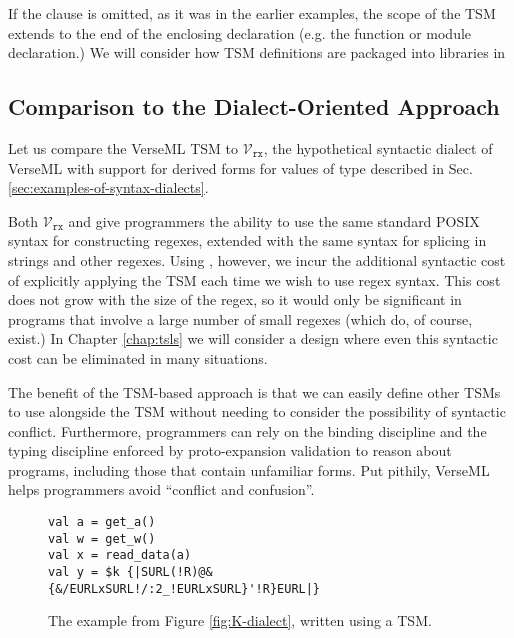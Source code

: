 If the  clause is omitted, as it was in the earlier examples, the scope of the TSM extends to the end of the enclosing declaration (e.g. the function or module declaration.)
We will consider how TSM definitions are packaged into libraries in 

\subsection{Comparison to the Dialect-Oriented Approach}
Let us compare the VerseML TSM  to $\mathcal{V}_\texttt{rx}$, the hypothetical syntactic dialect of VerseML with support for derived forms for values of type  described in Sec. \ref{sec:examples-of-syntax-dialects}.

Both $\mathcal{V}_\texttt{rx}$ and  give programmers the ability to use the same standard POSIX syntax for constructing regexes, extended with the same syntax for splicing in strings and other regexes. Using , however, we incur the additional syntactic cost of explicitly applying the  TSM each time we wish to use regex syntax. This cost does not grow with the size of the regex, so it would only be significant in programs that involve a large number of small regexes (which do, of course, exist.) In Chapter \ref{chap:tsls} we will consider a design where even this syntactic cost can be eliminated in many situations.

The benefit of the TSM-based approach is that we can easily define other TSMs to use alongside the  TSM without needing to consider the possibility of syntactic conflict. Furthermore, programmers can rely on the binding discipline and the typing discipline enforced by proto-expansion validation to reason about programs, including those that contain unfamiliar forms. Put pithily, VerseML helps programmers avoid ``conflict and confusion''. 

\begin{figure}
\begin{lstlisting}
val a = get_a()
val w = get_w()
val x = read_data(a)
val y = $k {|SURL(!R)@&{&/EURLxSURL!/:2_!EURLxSURL}'!R}EURL|}
\end{lstlisting}
\caption{The example from Figure \ref{fig:K-dialect}, written using a TSM.}
\label{fig:K-tsms}
\end{figure}

